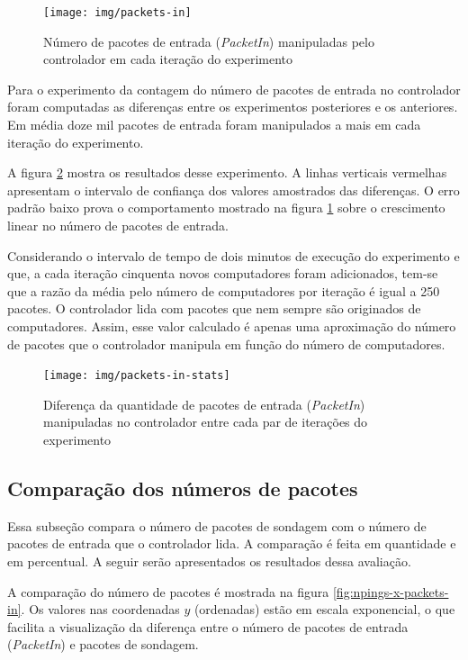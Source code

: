 \begin{figure}[!htb]
    \centering
    \label{fig:packets-in}
    \texttt{[image: img/packets-in]}
    \caption{Número de pacotes de entrada (\emph{PacketIn}) manipuladas pelo
    controlador em cada iteração do experimento}
\end{figure}


Para o experimento da contagem do número de pacotes de entrada no controlador
foram computadas as diferenças entre os experimentos posteriores e os
anteriores.
Em média doze mil pacotes de entrada foram manipulados a mais em cada
iteração do experimento.

A figura \ref{fig:packets-in-stats} mostra os resultados desse experimento.
A linhas verticais vermelhas apresentam o intervalo de confiança dos valores
amostrados das diferenças.
O erro padrão baixo prova o comportamento mostrado na figura
\ref{fig:packets-in} sobre o crescimento linear no número de pacotes de
entrada.

Considerando o intervalo de tempo de dois minutos de execução do experimento e
que, a cada iteração cinquenta novos computadores foram adicionados,
tem-se que a razão da média pelo número de computadores por iteração é igual
a 250 pacotes.
O controlador lida com pacotes que nem sempre são originados de computadores.
Assim, esse valor calculado é apenas uma aproximação do número de pacotes
que o controlador manipula em função do número de computadores.

\begin{figure}[!htb]
    \centering
    \label{fig:packets-in-stats}
    \texttt{[image: img/packets-in-stats]}
    \caption{Diferença da quantidade de pacotes de entrada (\emph{PacketIn})
    manipuladas no controlador entre cada par de iterações do experimento}
\end{figure}

\subsection{Comparação dos números de pacotes}

Essa subseção compara o número de pacotes de sondagem com o número de pacotes
de entrada que o controlador lida.
A comparação é feita em quantidade e em percentual.
A seguir serão apresentados os resultados dessa avaliação.

A comparação do número de pacotes é mostrada na figura
\ref{fig:npings-x-packets-in}.
Os valores nas coordenadas $y$ (ordenadas) estão em escala exponencial, o que
facilita a visualização da diferença entre o número de pacotes de entrada
(\emph{PacketIn}) e pacotes de sondagem.

